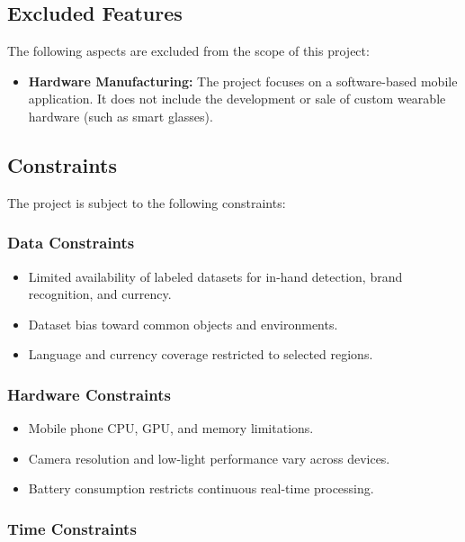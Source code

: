 \documentclass[a4paper]{report}
\begin{document}
\subsection{Excluded Features}

The following aspects are excluded from the scope of this project:

\begin{itemize}
  \item \textbf{Hardware Manufacturing:} The project focuses on a software-based mobile application. It does not include the development or sale of custom wearable hardware (such as smart glasses).
\end{itemize}

\subsection{Constraints}

The project is subject to the following constraints:

\subsubsection{Data Constraints}

\begin{itemize}
  \item Limited availability of labeled datasets for in-hand detection, brand recognition, and currency.
  \item Dataset bias toward common objects and environments.
  \item Language and currency coverage restricted to selected regions.
\end{itemize}

\subsubsection{Hardware Constraints}

\begin{itemize}
  \item Mobile phone CPU, GPU, and memory limitations.
  \item Camera resolution and low-light performance vary across devices.
  \item Battery consumption restricts continuous real-time processing.
\end{itemize}

\subsubsection{Time Constraints}
\end{document}
